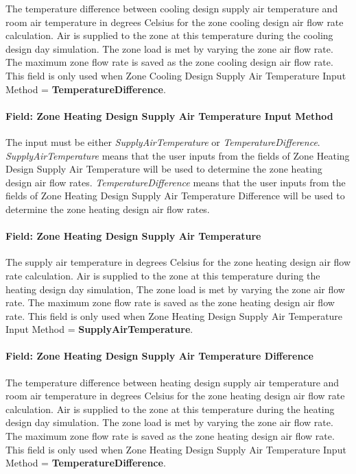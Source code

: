 The temperature difference between cooling design supply air temperature and room air temperature in degrees Celsius for the zone cooling design air flow rate calculation. Air is supplied to the zone at this temperature during the cooling design day simulation. The zone load is met by varying the zone air flow rate. The maximum zone flow rate is saved as the zone cooling design air flow rate. This field is only used when Zone Cooling Design Supply Air Temperature Input Method = \textbf{TemperatureDifference}.

\paragraph{Field: Zone Heating Design Supply Air Temperature Input Method}\label{field-zone-heating-design-supply-air-temperature-input-method}

The input must be either \emph{SupplyAirTemperature} or \emph{TemperatureDifference}. \emph{SupplyAirTemperature} means that the user inputs from the fields of Zone Heating Design Supply Air Temperature will be used to determine the zone heating design air flow rates. \emph{TemperatureDifference} means that the user inputs from the fields of Zone Heating Design Supply Air Temperature Difference will be used to determine the zone heating design air flow rates.

\paragraph{Field: Zone Heating Design Supply Air Temperature}\label{field-zone-heating-design-supply-air-temperature}

The supply air temperature in degrees Celsius for the zone heating design air flow rate calculation. Air is supplied to the zone at this temperature during the heating design day simulation, The zone load is met by varying the zone air flow rate. The maximum zone flow rate is saved as the zone heating design air flow rate. This field is only used when Zone Heating Design Supply Air Temperature Input Method = \textbf{SupplyAirTemperature}.

\paragraph{Field: Zone Heating Design Supply Air Temperature Difference}\label{field-zone-heating-design-supply-air-temperature-difference}

The temperature difference between heating design supply air temperature and room air temperature in degrees Celsius for the zone heating design air flow rate calculation. Air is supplied to the zone at this temperature during the heating design day simulation. The zone load is met by varying the zone air flow rate. The maximum zone flow rate is saved as the zone heating design air flow rate. This field is only used when Zone Heating Design Supply Air Temperature Input Method = \textbf{TemperatureDifference}.

